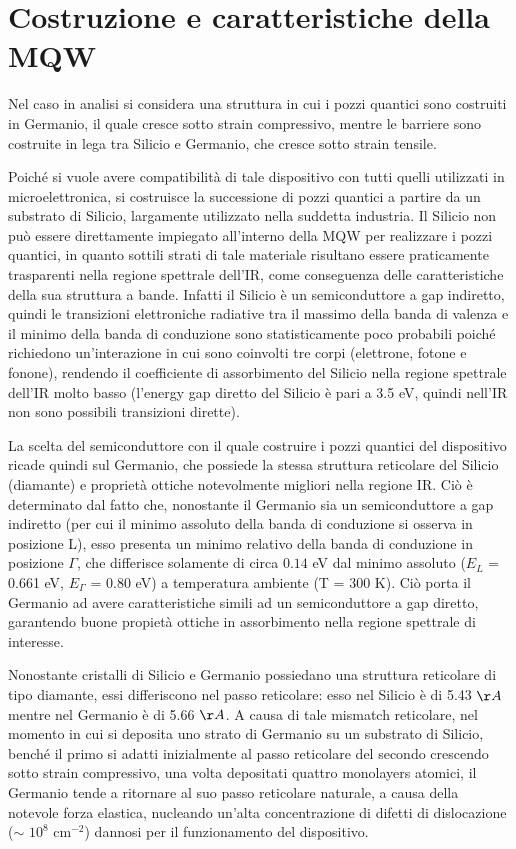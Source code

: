 \documentclass[journal]{IEEEtran}
\begin{document}
\section{Costruzione e caratteristiche della MQW}

Nel caso in analisi si considera una struttura in cui i pozzi quantici sono costruiti in Germanio, il quale cresce sotto strain compressivo, mentre le barriere sono costruite in lega tra Silicio e Germanio, che cresce sotto strain tensile.

Poiché si vuole avere compatibilità di tale dispositivo con tutti quelli utilizzati in microelettronica, si costruisce la successione di pozzi quantici a partire da un substrato di Silicio, largamente utilizzato nella suddetta industria.
Il Silicio non può essere direttamente impiegato all'interno della MQW per realizzare i pozzi quantici, in quanto sottili strati di tale materiale risultano essere praticamente trasparenti nella regione spettrale dell'IR, come conseguenza delle caratteristiche della sua struttura a bande.
Infatti il Silicio è un semiconduttore a gap indiretto, quindi le transizioni elettroniche radiative tra il massimo della banda di valenza e il minimo della banda di conduzione sono statisticamente poco probabili poiché richiedono un'interazione in cui sono coinvolti tre corpi (elettrone, fotone e fonone), rendendo il coefficiente di assorbimento del Silicio nella regione spettrale dell'IR molto basso (l'energy gap diretto del Silicio è pari a 3.5 eV, quindi nell'IR non sono possibili transizioni dirette).

La scelta del semiconduttore con il quale costruire i pozzi quantici del dispositivo ricade quindi sul Germanio, che possiede la stessa struttura reticolare del Silicio (diamante) e proprietà ottiche notevolmente migliori nella regione IR. Ciò è determinato dal fatto che, nonostante il Germanio sia un semiconduttore a gap indiretto (per cui il minimo assoluto della banda di conduzione si osserva in posizione L), esso presenta un minimo relativo della banda di conduzione in posizione $\Gamma$, che differisce solamente di circa $0.14$ eV dal minimo assoluto ($E_L$ = 0.661 eV, $E_\Gamma$ = 0.80 eV) a temperatura ambiente (T = 300 K). Ciò porta il Germanio ad avere caratteristiche simili ad un semiconduttore a gap diretto, garantendo buone propietà ottiche in assorbimento nella regione spettrale di interesse.



Nonostante cristalli di Silicio e Germanio possiedano una struttura reticolare di tipo diamante, essi differiscono nel passo reticolare: esso nel Silicio è di 5.43 $\AA$ mentre nel Germanio è di 5.66 $\AA$. A causa di tale mismatch reticolare, nel momento in cui si deposita uno strato di Germanio su un substrato di Silicio, benché il primo si adatti inizialmente al passo reticolare del secondo crescendo sotto strain compressivo, una volta depositati quattro monolayers atomici, il Germanio tende a ritornare al suo passo reticolare naturale, a causa della notevole forza elastica, nucleando un'alta concentrazione di difetti di dislocazione ($\sim$ $10^8$ cm$^{-2}$) dannosi per il funzionamento del dispositivo.
\end{document}
